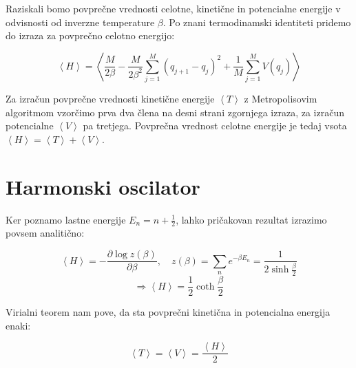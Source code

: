 \documentclass[a4paper]{article}
\newcommand{\pder}[2]{\frac{\partial#1}{\partial#2}}
\newcommand{\half}{\frac{1}{2}}
\newcommand{\expected}[1]{\left\langle #1 \right\rangle}
\begin{document}
    Raziskali bomo povprečne vrednosti celotne, kinetične in potencialne energije v odvisnosti od inverzne temperature
    $\beta$.
    Po znani termodinamski identiteti pridemo do izraza za povprečno celotno energijo:

    \begin{equation}\label{eq5}
        \expected{H} = \expected{\frac{M}{2\beta} - \frac{M}{2\beta^2}\sum_{j=1}^M (q_{j+1} - q_j)^2
                                + \frac{1}{M}\sum_{j=1}^M V(q_j)}
    \end{equation}

    Za izračun povprečne vrednosti kinetične energije $\expected{T}$ z Metropolisovim algoritmom vzorčimo prva dva člena
    na desni strani zgornjega izraza, za izračun potencialne $\expected{V}$ pa tretjega.
    Povprečna vrednost celotne energije je tedaj vsota $\expected{H} = \expected{T} + \expected{V}$.

    \section{Harmonski oscilator}

    Ker poznamo lastne energije $E_n = n + \half$, lahko pričakovan rezultat izrazimo povsem analitično:

    \begin{equation}\label{eq6}
        \expected{H} = -\pder{\log{z(\beta)}}{\beta}, \quad
        z(\beta) = \sum_n e^{-\beta E_n} = \frac{1}{2 \sinh{\frac{\beta}{2}}}
    \end{equation}
    \begin{equation}\label{eq7}
        \Rightarrow \expected{H} = \half \coth{\frac{\beta}{2}}
    \end{equation}

    Virialni teorem nam pove, da sta povprečni kinetična in potencialna energija enaki:

    \begin{equation}\label{eq8}
        \expected{T} = \expected{V} = \frac{\expected{H}}{2}
    \end{equation}

    \iffalse
    \begin{figure}
        \centering
        \begin{subfigure}{\textwidth}
            \texttt{[image: slika1.pdf]}
            \caption{}
        \end{subfigure}
        \begin{subfigure}{\textwidth}
            \texttt{[image: slika2.pdf]}
            \caption{}
        \end{subfigure}
        \begin{subfigure}{\textwidth}
            \texttt{[image: slika3.pdf]}
            \caption{}
        \end{subfigure}
        \caption{Fazni prehodi Isingovega modela za različno velike mreže.
        Oranžna črta prilagojena na graf magnetizacije predstavlja Onsagerjevo formulo za spontano magnetizacijo.
        Z rdečo vertikalno črto je označena kritična temperatura določena s to prilagoditvijo.
        Vse je računano pri sklopitveni konstanti $J = 1$.}
        \label{slika1}
    \end{figure}
    \fi
\end{document}
